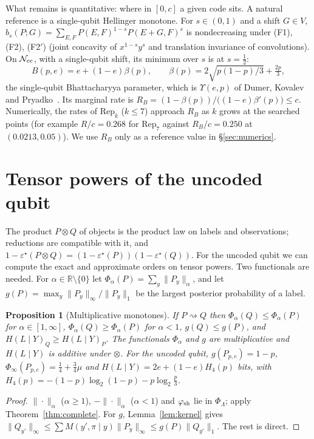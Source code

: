 \documentclass[11pt,a4paper]{article}
\theoremstyle{plain}
\newtheorem{proposition}[theorem]{Proposition}
\theoremstyle{definition}
\theoremstyle{remark}
\newcommand{\err}{\varepsilon^{\star}}
\newcommand{\Ncc}{\mathcal{N}_{\rm cc}}
\newcommand{\red}{\rightsquigarrow}
\newcommand{\Rep}{\mathrm{Rep}}
\begin{document}
\noindent What remains is quantitative: where in $[0,c]$ a given code sits. A natural reference is a single-qubit Hellinger monotone. For $s\in(0,1)$ and a shift $G\in V$, $b_s(P;G)=\sum_{E,F}P(E,F)^{1-s}P(E+G,F)^s$ is nondecreasing under (F1), (F2), (F2$'$) (joint concavity of $x^{1-s}y^s$ and translation invariance of convolutions). On $\Ncc$, with a single-qubit shift, its minimum over $s$ is at $s=\tfrac12$:
\[
B(p,e)=e+(1-e)\beta(p),\qquad \beta(p)=2\sqrt{p(1-p)/3}+\tfrac{2p}{3},
\]
the single-qubit Bhattacharyya parameter, which is $\Upsilon(e,p)$ of Dumer, Kovalev and Pryadko~\cite{DKP}. Its marginal rate is $R_B=(1-\beta(p))/\big((1-e)\beta'(p)\big)\le c$. Numerically, the rates of $\Rep_k$ ($k\le7$) approach $R_B$ as $k$ grows at the searched points (for example $R/c=0.268$ for $\Rep_7$ against $R_B/c=0.250$ at $(0.0213,0.05)$). We use $R_B$ only as a reference value in \S\ref{sec:numerics}.

\section{Tensor powers of the uncoded qubit}\label{sec:tensor}

The product $P\otimes Q$ of objects is the product law on labels and observations; reductions are compatible with it, and $1-\err(P\otimes Q)=(1-\err(P))(1-\err(Q))$. For the uncoded qubit we can compute the exact and approximate orders on tensor powers. Two functionals are needed. For $\alpha\in\mathbb R\setminus\{0\}$ let $\Phi_\alpha(P)=\sum_y\|P_y\|_\alpha$, and let $g(P)=\max_y\|P_y\|_\infty/\|P_y\|_1$ be the largest posterior probability of a label.

\begin{proposition}[Multiplicative monotones]\label{prop:power-family}
If $P\red Q$ then $\Phi_\alpha(Q)\le\Phi_\alpha(P)$ for $\alpha\in[1,\infty]$, $\Phi_\alpha(Q)\ge\Phi_\alpha(P)$ for $\alpha<1$, $g(Q)\le g(P)$, and $H(L\mid Y)_Q\ge H(L\mid Y)_P$. The functionals $\Phi_\alpha$ and $g$ are multiplicative and $H(L\mid Y)$ is additive under $\otimes$. For the uncoded qubit, $g(P_{p,e})=1-p$, $\Phi_\infty(P_{p,e})=\tfrac14+\tfrac34\mu$ and $H(L\mid Y)=2e+(1-e)H_4(p)$ bits, with $H_4(p)=-(1-p)\log_2(1-p)-p\log_2\frac p3$.
\end{proposition}
\begin{proof}
$\|\cdot\|_\alpha$ ($\alpha\ge1$), $-\|\cdot\|_\alpha$ ($\alpha<1$) and $\varphi_{\rm sh}$ lie in $\Phi_\Lambda$; apply Theorem~\ref{thm:complete}. For $g$, Lemma~\ref{lem:kernel} gives $\|Q_{y'}\|_\infty\le\sum M(y',\pi\mid y)\|P_y\|_\infty\le g(P)\|Q_{y'}\|_1$. The rest is direct.
\end{proof}
\end{document}
